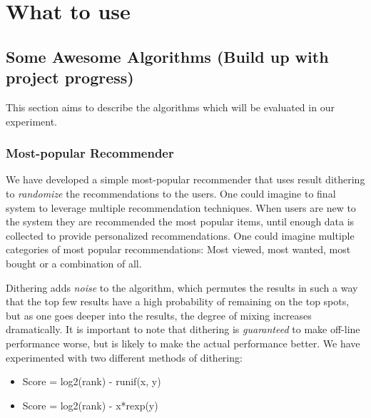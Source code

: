 
\section{What to use}




\subsection{Some Awesome Algorithms (Build up with project progress)}

This section aims to describe the algorithms which will be evaluated in our experiment.

\subsubsection{Most-popular Recommender}

We have developed a simple most-popular recommender that uses result dithering to \emph{randomize} the recommendations to the users. One could imagine to final system to leverage multiple recommendation techniques. When users are new to the system they are recommended the most popular items, until enough data is collected to provide personalized recommendations. One could imagine multiple categories of most popular recommendations: Most viewed, most wanted, most bought or a combination of all.

Dithering adds \emph{noise} to the algorithm, which permutes the results in such a way that the top few results have a high probability of remaining on the top spots, but as one goes deeper into the results, the degree of mixing increases dramatically. It is important to note that dithering is \emph{guaranteed} to make off-line performance worse, but is likely to make the actual performance better. We have experimented with two different methods of dithering:

\begin{itemize}
\item Score = log2(rank) - runif(x, y)
\item Score = log2(rank) - x*rexp(y)
\end{itemize}

